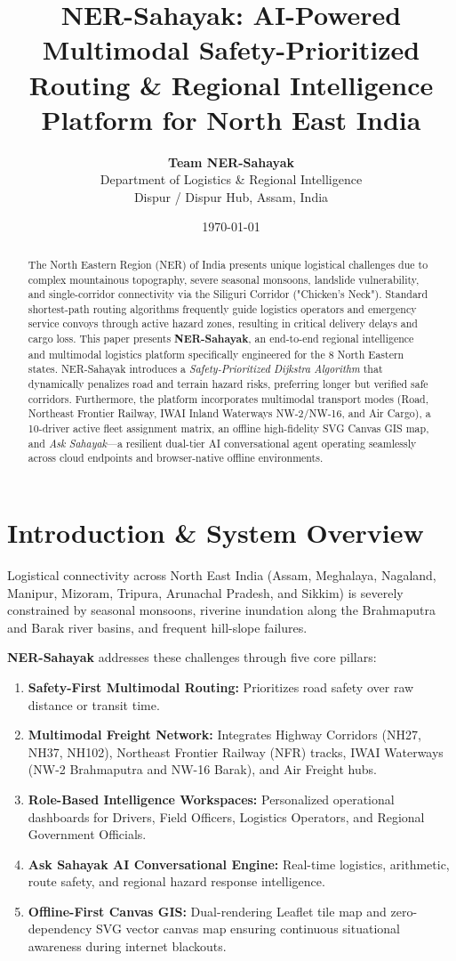 \documentclass[11pt,a4paper]{article}
\title{\textbf{NER-Sahayak: AI-Powered Multimodal Safety-Prioritized Routing \& Regional Intelligence Platform for North East India}}
\author{\textbf{Team NER-Sahayak} \\ Department of Logistics \& Regional Intelligence \\ Dispur / Dispur Hub, Assam, India}
\date{\today}
\begin{document}
\maketitle

\begin{abstract}
The North Eastern Region (NER) of India presents unique logistical challenges due to complex mountainous topography, severe seasonal monsoons, landslide vulnerability, and single-corridor connectivity via the Siliguri Corridor ("Chicken's Neck"). Standard shortest-path routing algorithms frequently guide logistics operators and emergency service convoys through active hazard zones, resulting in critical delivery delays and cargo loss. This paper presents \textbf{NER-Sahayak}, an end-to-end regional intelligence and multimodal logistics platform specifically engineered for the 8 North Eastern states. NER-Sahayak introduces a \textit{Safety-Prioritized Dijkstra Algorithm} that dynamically penalizes road and terrain hazard risks, preferring longer but verified safe corridors. Furthermore, the platform incorporates multimodal transport modes (Road, Northeast Frontier Railway, IWAI Inland Waterways NW-2/NW-16, and Air Cargo), a 10-driver active fleet assignment matrix, an offline high-fidelity SVG Canvas GIS map, and \textit{Ask Sahayak}---a resilient dual-tier AI conversational agent operating seamlessly across cloud endpoints and browser-native offline environments.
\end{abstract}

\section{Introduction \& System Overview}
Logistical connectivity across North East India (Assam, Meghalaya, Nagaland, Manipur, Mizoram, Tripura, Arunachal Pradesh, and Sikkim) is severely constrained by seasonal monsoons, riverine inundation along the Brahmaputra and Barak river basins, and frequent hill-slope failures.

\textbf{NER-Sahayak} addresses these challenges through five core pillars:
\begin{enumerate}
    \item \textbf{Safety-First Multimodal Routing:} Prioritizes road safety over raw distance or transit time.
    \item \textbf{Multimodal Freight Network:} Integrates Highway Corridors (NH27, NH37, NH102), Northeast Frontier Railway (NFR) tracks, IWAI Waterways (NW-2 Brahmaputra and NW-16 Barak), and Air Freight hubs.
    \item \textbf{Role-Based Intelligence Workspaces:} Personalized operational dashboards for Drivers, Field Officers, Logistics Operators, and Regional Government Officials.
    \item \textbf{Ask Sahayak AI Conversational Engine:} Real-time logistics, arithmetic, route safety, and regional hazard response intelligence.
    \item \textbf{Offline-First Canvas GIS:} Dual-rendering Leaflet tile map and zero-dependency SVG vector canvas map ensuring continuous situational awareness during internet blackouts.
\end{enumerate}
\end{document}
